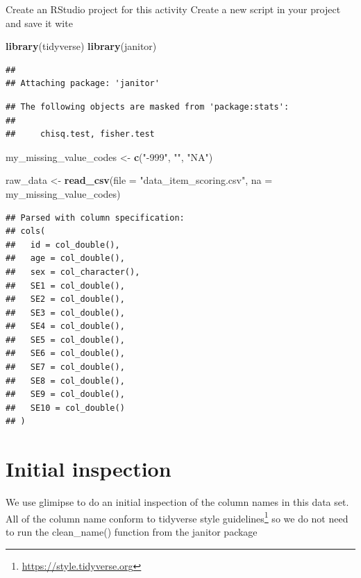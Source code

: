 \documentclass[
]{krantz}
\makeatletter
\newenvironment{Shaded}{\begin{snugshade}}{\end{snugshade}}
\newcommand{\DataTypeTok}[1]{\textcolor[rgb]{0.27,0.27,0.27}{#1}}
\newcommand{\KeywordTok}[1]{\textcolor[rgb]{0.27,0.27,0.27}{\textbf{#1}}}
\newcommand{\NormalTok}[1]{#1}
\newcommand{\StringTok}[1]{\textcolor[rgb]{0.5,0.5,0.5}{#1}}
\renewcommand{\href}[2]{#2\footnote{\url{#1}}}
\newenvironment{kframe}{%
\medskip{}
\setlength{\fboxsep}{.8em}
 \def\at@end@of@kframe{}%
 \ifinner\ifhmode%
  \def\at@end@of@kframe{\end{minipage}}%
  \begin{minipage}{\columnwidth}%
 \fi\fi%
 \def\FrameCommand##1{\hskip\@totalleftmargin \hskip-\fboxsep
 \colorbox{shadecolor}{##1}\hskip-\fboxsep
     \hskip-\linewidth \hskip-\@totalleftmargin \hskip\columnwidth}%
 \MakeFramed {\advance\hsize-\width
   \@totalleftmargin\z@ \linewidth\hsize
   \@setminipage}}%
 {\par\unskip\endMakeFramed%
 \at@end@of@kframe}
\renewenvironment{Shaded}{\begin{kframe}}{\end{kframe}}
\makeatother
\begin{document}
Create an RStudio project for this activity
Create a new script in your project and save it wite

\begin{Shaded}
\begin{Highlighting}[]
\KeywordTok{library}\NormalTok{(tidyverse)}
\KeywordTok{library}\NormalTok{(janitor)}
\end{Highlighting}
\end{Shaded}

\begin{verbatim}
## 
## Attaching package: 'janitor'
\end{verbatim}

\begin{verbatim}
## The following objects are masked from 'package:stats':
## 
##     chisq.test, fisher.test
\end{verbatim}

\begin{Shaded}
\begin{Highlighting}[]
\NormalTok{my_missing_value_codes <-}\StringTok{ }\KeywordTok{c}\NormalTok{(}\StringTok{"-999"}\NormalTok{, }\StringTok{""}\NormalTok{, }\StringTok{"NA"}\NormalTok{)}

\NormalTok{raw_data <-}\StringTok{ }\KeywordTok{read_csv}\NormalTok{(}\DataTypeTok{file =} \StringTok{"data_item_scoring.csv"}\NormalTok{,}
                     \DataTypeTok{na =}\NormalTok{ my_missing_value_codes)}
\end{Highlighting}
\end{Shaded}

\begin{verbatim}
## Parsed with column specification:
## cols(
##   id = col_double(),
##   age = col_double(),
##   sex = col_character(),
##   SE1 = col_double(),
##   SE2 = col_double(),
##   SE3 = col_double(),
##   SE4 = col_double(),
##   SE5 = col_double(),
##   SE6 = col_double(),
##   SE7 = col_double(),
##   SE8 = col_double(),
##   SE9 = col_double(),
##   SE10 = col_double()
## )
\end{verbatim}

\hypertarget{initial-inspection}{%
\section{Initial inspection}\label{initial-inspection}}

We use glimipse to do an initial inspection of the column names in this data set. All of the column name conform to \href{https://style.tidyverse.org}{tidyverse style guidelines} so we do not need to run the clean\_name() function from the janitor package
\end{document}
